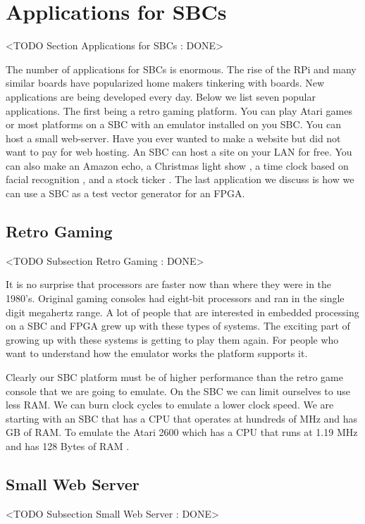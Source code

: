 \section{Applications for SBCs}
	<TODO Section Applications for SBCs : DONE>
	
The number of applications for \ac{SBC}s is enormous. The rise of the \ac{RPi} and many similar boards have popularized home makers tinkering with boards. New applications are being developed every day. Below we list seven popular applications. The first being a retro gaming platform. You can play Atari games or most platforms on a \ac{SBC} with an emulator installed on you \ac{SBC}. You can host a small web-server. Have you ever wanted to make a website but did not want to pay for web hosting. An \ac{SBC} can host a site on your \ac{LAN} for free. You can also make an Amazon echo, a Christmas light show \cite{cliteshow}, a time clock based on facial recognition \cite{facepunch}, and a stock ticker \cite{stocktick}. The last application we discuss is how we can use a \ac{SBC} as a test vector generator for an \ac{FPGA}. 

\subsection{Retro Gaming}
	<TODO Subsection Retro Gaming : DONE>
	
It is no surprise that processors are faster now than where they were in the 1980's. Original gaming consoles had eight-bit processors and ran in the single digit megahertz range. A lot of people that are interested in embedded processing on a \ac{SBC} and \ac{FPGA} grew up with these types of systems. The exciting part of growing up with these systems is getting to play them again. For people who want to understand how the emulator works the platform supports it.

Clearly our \ac{SBC} platform must be of higher performance than the retro game console that we are going to emulate. On the \ac{SBC} we can limit ourselves to use less \ac{RAM}. We can burn clock cycles to emulate a lower clock speed. We are starting with an \ac{SBC} that has a \ac{CPU} that operates at hundreds of \ac{MHz} and has \ac{GB} of \ac{RAM}. To emulate the Atari 2600 which has a \ac{CPU} that runs at 1.19 \ac{MHz} and has 128 Bytes of \ac{RAM} \cite{atarispec}.

\subsection{Small Web Server}
	<TODO Subsection Small Web Server : DONE>

